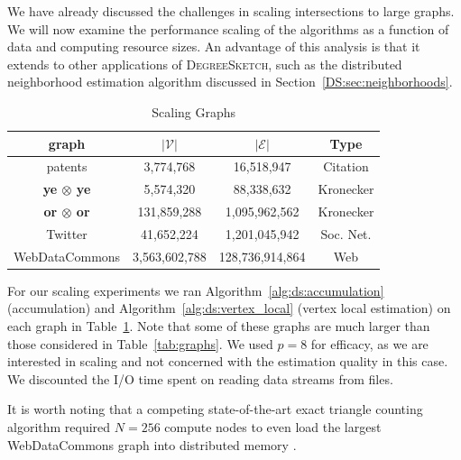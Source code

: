 \documentclass[10]{report}
\newcommand{\algoname}[1]{\textnormal{\textsc{#1}}}
\begin{document}
We have already discussed the challenges in scaling intersections to large graphs. 
We will now examine the performance scaling of the algorithms as a function of data and computing resource sizes.
An advantage of this analysis is that it extends to other applications of \algoname{DegreeSketch}, such as the distributed neighborhood estimation algorithm discussed in Section~\ref{DS:sec:neighborhoods}.

\begin{table}[htbp]
\caption{Scaling Graphs \label{tab:scaling_graphs}}
\begin{center}
\begin{tabular}{|c|c|c|c|}
\hline
\textbf{graph} & $|\mathcal{V}|$ &  $|\mathcal{E}|$ & Type \\
\hline
\hline
patents & 3,774,768 & 16,518,947 & Citation \\
\hline
\textbf{ye $\boldsymbol{\otimes}$ ye} & 5,574,320 & 88,338,632 & Kronecker \\
\hline
\textbf{or $\boldsymbol{\otimes}$ or} & 131,859,288 & 1,095,962,562 & Kronecker \\
\hline
Twitter & 41,652,224 & 1,201,045,942 & Soc. Net. \cite{kunegis2013konect} \\
\hline
WebDataCommons & 3,563,602,788 & 128,736,914,864 & Web \\
\hline
\end{tabular}
\end{center}
\end{table}


For our scaling experiments we ran Algorithm~\ref{alg:ds:accumulation} (accumulation) and Algorithm~\ref{alg:ds:vertex_local} (vertex local estimation) on each graph in Table~\ref{tab:scaling_graphs}.
Note that some of these graphs are much larger than those considered in Table~\ref{tab:graphs}.
We used $p=8$ for efficacy, as we are interested in scaling and not concerned with the estimation quality in this case. 
We discounted the I/O time spent on reading data streams from files.

It is worth noting that a competing state-of-the-art exact triangle counting algorithm required $N=256$ compute nodes to even load the largest WebDataCommons graph into distributed memory \cite{pearce2017triangle}.
\end{document}
